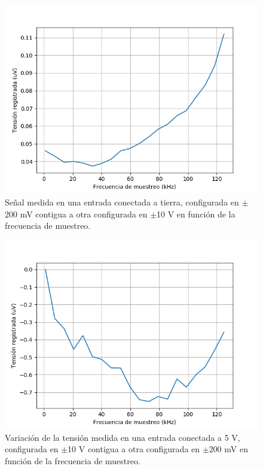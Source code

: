\documentclass[a4paper,11pt]{article}
\begin{document}
\begin{figure}[h!]
\centering
\includegraphics[height=.42\textheight]{figs/settling0V.png}
\caption{Señal medida en una entrada conectada a tierra, configurada en $\pm$200 mV contigua a otra configurada en $\pm$10 V en función de la frecuencia de muestreo.}
\label{fig:settling1}
\end{figure}

\begin{figure}[h!]
\centering
\includegraphics[height=.42\textheight]{figs/settling5V.png}
\caption{Variación de la tensión medida en una entrada conectada a 5 V, configurada en $\pm$10 V contigua a otra configurada en $\pm$200 mV en función de la frecuencia de muestreo.}
\label{fig:settling2}
\end{figure}
\end{document}
